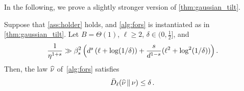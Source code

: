 


In the following, we prove a slightly stronger version of \cref{thm:gaussian_tilt}.

\begin{theorem}\label{thm:gaussian_tilt_full}
Suppose that \cref{ass:holder} holds, and \cref{alg:fors} is instantiated as in \cref{thm:gaussian_tilt}. Let $B=\Theta(1)$, $\ell\geq 2$, $\delta\in(0,\frac12]$, and
\begin{align*}
    \frac{1}{\eta^{1+s}}\gg \beta_s^2\,\prn[\Big]{d^s\,(\ell+\log(1/\delta))+\frac{s}{d^{1-s}}(\ell^2+\log^2(1/\delta))}\,.
\end{align*}
Then, the law $\wh\nu$ of~\cref{alg:fors} satisfies
\begin{align*}
    \Dsys[\ell]{\nuhat}{\nu} \leq \delta\,.
\end{align*}
\end{theorem}

